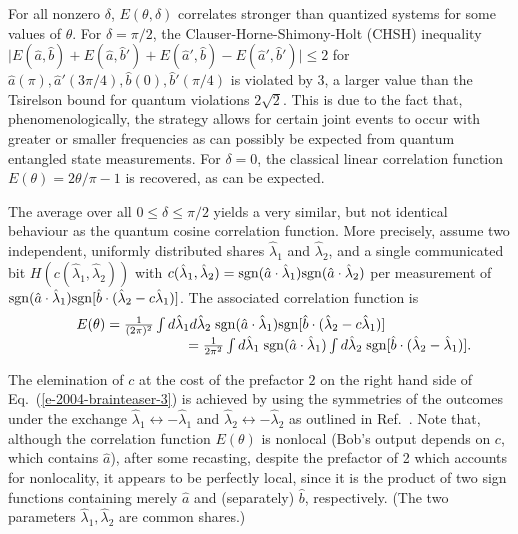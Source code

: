 \documentclass[prl,showpacs,showkeys,amsfonts,preprint]{revtex4}
\begin{document}
For all nonzero $\delta$, $E(\theta ,\delta )$ correlates stronger than quantized systems
for some values of $\theta$.
For $\delta =\pi /2$, the Clauser-Horne-Shimony-Holt (CHSH) inequality
$
\vert
E({\hat a} ,{\hat b} )+
E({\hat a} ,{\hat b} ' )+
E({\hat a}' ,{\hat b} )-
E({\hat a} ',{\hat b} ')
\vert
\le 2
$
for ${\hat a} (\pi ),{\hat a} '(3\pi /4),{\hat b} (0),{\hat b} '( \pi /4)$
is violated by 3, a larger value
than the Tsirelson bound for quantum violations $2\sqrt{2}$.
This is due to the fact that, phenomenologically, the strategy allows for
certain joint events to occur with greater or smaller frequencies as can possibly be
expected from quantum entangled state measurements.
For $\delta =0$, the classical linear correlation function
$E(\theta )=  2\theta /\pi -1$ is recovered, as can be expected.

The average over all $0\le \delta \le \pi /2$
yields a very similar, but not identical behaviour
as the   quantum cosine correlation function.
More precisely,
assume two independent,
uniformly distributed shares ${\hat \lambda}_1$ and ${\hat \lambda}_2$, and
a single communicated bit $H(c({\hat \lambda}_1,{\hat \lambda}_2))$ with
$c({\hat \lambda}_1,{\hat \lambda}_2)=
{\rm sgn}({\hat a} \cdot {\hat \lambda }_1){\rm sgn}({\hat a} \cdot {\hat \lambda}_2)$
per measurement of
$
{\rm sgn}
({\hat a}\cdot {\hat \lambda}_1)
{\rm sgn}
[{\hat b}\cdot ({\hat \lambda}_2-c{\hat \lambda}_1)]
$.
The associated correlation function is
\begin{equation}
\begin{array}{cll}
&&E(\theta ) =
{1\over (2 \pi)^2}
\int d {\hat\lambda_1}  d {\hat\lambda_2}  \;
{\rm sgn}
({\hat a}\cdot {\hat \lambda}_1)
{\rm sgn}
[{\hat b}\cdot ({\hat \lambda}_2-c{\hat \lambda}_1)] \\
&&\qquad \qquad \qquad \qquad  =
{1\over 2 \pi^2}
\int d {\hat\lambda_1}  \;
{\rm sgn}
({\hat a}\cdot {\hat \lambda}_1)
\int d {\hat\lambda_2}    \;
{\rm sgn}
[{\hat b}\cdot ({\hat \lambda}_2-{\hat \lambda}_1)].
\end{array}
\label{e-2004-brainteaser-3}
\end{equation}

The elemination of $c$ at the cost of the prefactor $2$
on the right hand side of Eq.~(\ref{e-2004-brainteaser-3}) is achieved by
using the symmetries of the outcomes under the exchange
${\hat \lambda }_1 \longleftrightarrow -{\hat \lambda }_1$
and
${\hat \lambda }_2 \longleftrightarrow -{\hat \lambda }_2$
as outlined in Ref.~\cite{toner-bacon-03}.
Note that, although the correlation function $E(\theta )$ is
nonlocal
(Bob's output depends on $c$, which contains ${\hat a}$),
after some recasting, despite the prefactor of 2 which accounts for nonlocality,
it appears to be perfectly local,
since it is the product of two sign functions
containing merely ${\hat a}$ and  (separately) ${\hat b}$, respectively.
(The two parameters $ {\hat \lambda }_1, {\hat \lambda }_2$ are common shares.)
\end{document}
